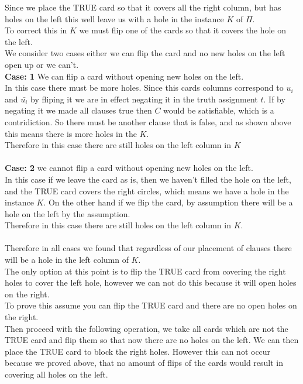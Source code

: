\documentclass{article}
\begin{document}
      Since we place the TRUE card so that it covers all the right column, but has holes on the left this well leave us with a hole in the instance $K$ of $\Pi$.\\
      To correct this in $K$ we must flip one of the cards so that it covers the hole on the left.\\
      We consider two cases either we can flip the card and no new holes on the left open up or we can't.\\
      \textbf{Case: 1} We can flip a card without opening new holes on the left.\\
      In this case there must be more holes. Since this cards columns correspond to $u_{i}$ and $\bar{u_{i}}$ by fliping it we are in effect negating it in the truth assignment $t$. If by negating it we made all clauses true then $C$ would be satisfiable, which is a contridiction. So there must be another clause that is false, and as shown above this means there is more holes in the $K$.\\
      Therefore in this case there are still holes on the left column in $K$\\
      \\
      \textbf{Case: 2} we cannot flip a card without opening new holes on the left.\\
      In this case if we leave the card as is, then we haven't filled the hole on the left, and the TRUE card covers the right circles, which means we have a hole in the instance $K$.
      On the other hand if we flip the card, by assumption there will be a hole on the left by the assumption.\\
      Therefore in this case there are still holes on the left column in $K$.\\
      \\
      Therefore in all cases we found that regardless of our placement of clauses there will be a hole in the left column of $K$.\\
      The only option at this point is to flip the TRUE card from covering the right holes to cover the left hole, however we can not do this because it will open holes on the right.\\
      To prove this assume you can flip the TRUE card and there are no open holes on the right.\\
      Then proceed with the following operation, we take all cards which are not the TRUE card and flip them so that now there are no holes on the left. We can then place the TRUE card to block the right holes.
      However this can not occur because we proved above, that no amount of flips of the cards would result in covering all holes on the left.\\
\end{document}

